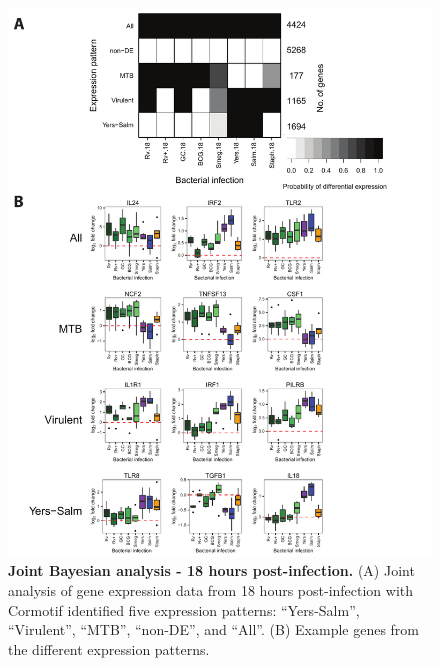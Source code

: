 \begin{figure}
\centering
\includegraphics[width=5in]{img/ch02/fig-03-joint-18h.pdf}
\caption[Joint Bayesian analysis - 18 hours
  post-infection.]{\textbf{Joint Bayesian analysis - 18 hours
    post-infection.} (A) Joint analysis of gene expression data from
  18 hours post-infection with Cormotif identified five expression
  patterns: ``Yers-Salm'', ``Virulent'', ``MTB'', ``non-DE'', and
  ``All''. (B) Example genes from the different expression patterns.}
\label{fig:joint-18h}
\end{figure}

